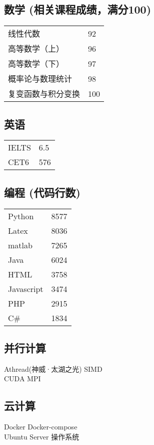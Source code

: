 \documentclass[]{deedy-resume-openfont}
\begin{document}
\begin{minipage}[t]{0.25\textwidth}
	\subsection{数学 {\small (相关课程成绩，满分100)}}
	\begin{tabular}{ll}
		线性代数           & 92  \\
		高等数学（上）     & 96  \\
		高等数学（下）     & 97  \\
		概率论与数理统计   & 98  \\
		复变函数与积分变换 & 100 \\
	\end{tabular}
	\sectionsep
	\subsection{英语}
	\begin{tabular}{ll}
		IELTS & 6.5 \\
		CET6  & 576 \\
	\end{tabular}
	\sectionsep
	\subsection{编程 {\small (代码行数)}}
	\begin{tabular}{ll}
		Python     & 8577  \\
		Latex      & 8036  \\
		matlab     & 7265  \\
		Java       & 6024  \\
		HTML       & 3758  \\
		Javascript & 3474  \\
		PHP        & 2915  \\
		C\#        & 1834  \\
	\end{tabular}
	\sectionsep
    
	\subsection{并行计算}
	Athread(神威·太湖之光) \textbullet{} SIMD \\
	CUDA \textbullet{} MPI \\
    \sectionsep
    
	\subsection{云计算}
	Docker \textbullet{} Docker-compose \\
	Ubuntu Server 操作系统\\
	\sectionsep


\end{minipage}
\end{document}
